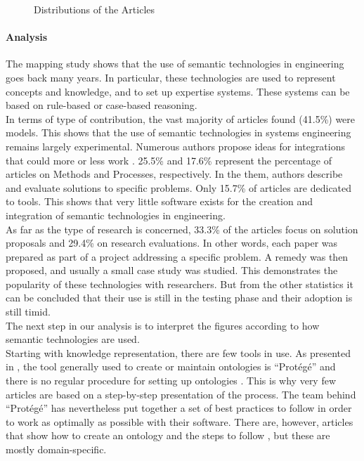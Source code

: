 \begin{figure}[h]
\begin{subfigure}[b]{0.45\textwidth}
                \end{subfigure}
                \caption{\label{fig:distro-art} Distributions of the Articles}
            \end{figure}
            
            \paragraph{Analysis\label{para:sms_analysis}}
            The mapping study shows that the use of semantic technologies in engineering goes back many years. In particular, these technologies are used to represent concepts and knowledge, and to set up expertise systems. These systems can be based on rule-based or case-based reasoning.\\
            
            In terms of type of contribution, the vast majority of articles found (41.5\%) were models. This shows that the use of semantic technologies in systems engineering remains largely experimental. Numerous authors propose ideas for integrations that could more or less work \cite{benjamin2007using, tofani2010using, benjamin2006using, bouza2008semtree}. 25.5\% and 17.6\% represent the percentage of articles on Methods and Processes, respectively. In the them, authors describe and evaluate solutions to specific problems. Only 15.7\% of articles are dedicated to tools. This shows that very little software exists for the creation and integration of semantic technologies in engineering.\\
            As far as the type of research is concerned, 33.3\% of the articles focus on solution proposals and 29.4\% on research evaluations. In other words, each paper was prepared as part of a project addressing a specific problem. A remedy was then proposed, and usually a small case study was studied. This demonstrates the popularity of these technologies with researchers. But from the other statistics it can be concluded that their use is still in the testing phase and their adoption is still timid.\\

            The next step in our analysis is to interpret the figures according to how semantic technologies are used.\\
            Starting with knowledge representation, there are few tools in use. As presented in \cite{chen2012recommendation, abadi2018improving, liu2010ontology}, the tool generally used to create or maintain ontologies is “Protégé” and there is no regular procedure for setting up ontologies \cite{noy2001ontology}. This is why very few articles are based on a step-by-step presentation of the process. The team behind “Protégé” has nevertheless put together a set of best practices to follow \cite{noy2001ontology} in order to work as optimally as possible with their software. There are, however, articles that show how to create an ontology and the steps to follow \cite{sure2002methodology, li2018ontology}, but these are mostly domain-specific. \\

